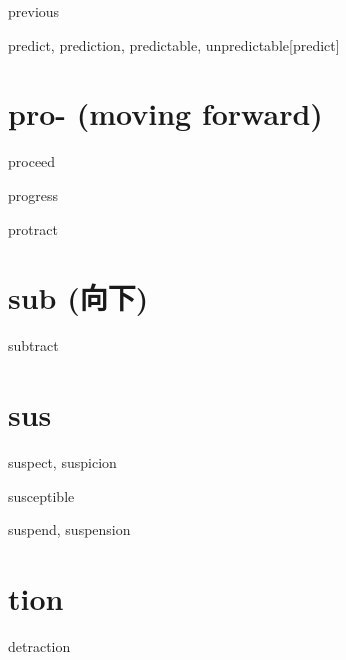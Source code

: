 \begin{wordRef}{previous}
\end{wordRef}

\begin{wordRef}{predict, prediction, predictable, unpredictable}[predict]
\end{wordRef}

\section{pro- (moving forward)}

\begin{wordRef}{proceed}
\end{wordRef}

\begin{wordRef}{progress}
\end{wordRef}

\begin{wordRef}{protract}
\end{wordRef}

\section{sub (向下)}

\begin{wordRef}{subtract}
\end{wordRef}

\section{sus}

\begin{wordRef}{suspect, suspicion}
\end{wordRef}

\begin{wordRef}{susceptible}
\end{wordRef}

\begin{wordRef}{suspend, suspension}
\end{wordRef}

\section{tion}

\begin{wordRef}{detraction}
\end{wordRef}

